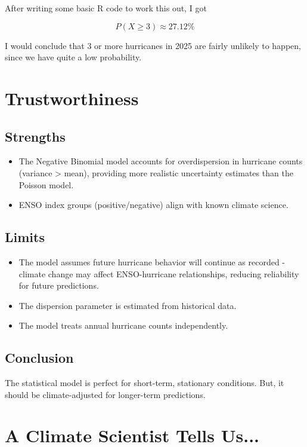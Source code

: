 \documentclass[11pt,spanish]{report}
\begin{document}
    After writing some basic R code to work this out, I got
    
    \[P(X\geq3)\approx27.12\%\]

    I would conclude that 3 or more hurricanes in 2025 are fairly unlikely to happen, since we have quite a low probability.

    \section{Trustworthiness}

    \subsection{Strengths}

    \begin{itemize}
        \item The Negative Binomial model accounts for overdispersion in hurricane counts (variance > mean), providing more realistic uncertainty estimates than the Poisson model.
        \item ENSO index groups (positive/negative) align with known climate science.
    \end{itemize}

    \subsection{Limits}

    \begin{itemize}
        \item The model assumes future hurricane behavior will continue as recorded - climate change may affect ENSO-hurricane relationships, reducing reliability for future predictions.
        \item The dispersion parameter is estimated from historical data. 
        \item The model treats annual hurricane counts independently.
    \end{itemize}

    \subsection{Conclusion}

    The statistical model is perfect for short-term, stationary conditions. But, it should be climate-adjusted for longer-term predictions.

    \section{A Climate Scientist Tells Us...}
\end{document}
